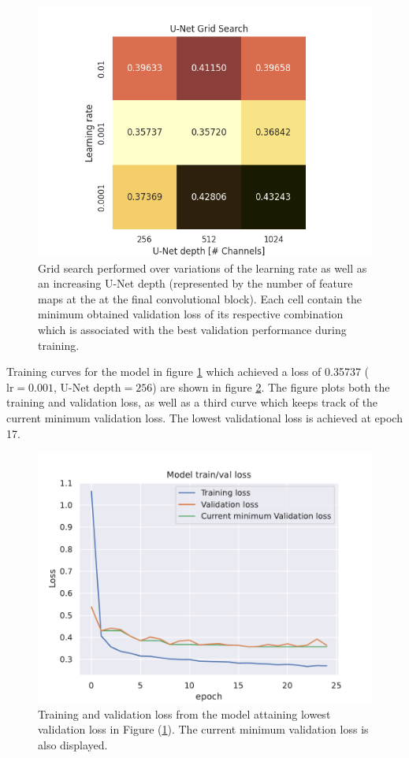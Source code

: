 \documentclass[../main/thesis]{subfiles}
\begin{document}
\begin{figure}
    \centering
    \includegraphics[width=.8\textwidth]{grid_search}
    \caption{\label{fig:gs}Grid search performed over variations of the learning rate as well as an increasing U-Net depth (represented by the number of feature maps at the at the final convolutional block). Each cell contain the minimum obtained validation loss of its respective combination which is associated with the best validation performance during training.}
\end{figure}

Training curves for the model in figure \ref{fig:gs} which achieved a loss of 0.35737 ($\text{lr} = 0.001$, $\text{U-Net depth} = 256$) are shown in figure \ref{fig:loss_curve_from_gs}. The figure plots both the training and validation loss, as well as a third curve which keeps track of the current minimum validation loss. The lowest validational loss is achieved at epoch 17. 

\begin{figure}
    \centering
    \includegraphics[width=\textwidth]{loss_curve_best_model_gs}
    \caption{\label{fig:loss_curve_from_gs}Training and validation loss from the model attaining lowest validation loss in Figure (\ref{fig:gs}). The current minimum validation loss is also displayed.}
\end{figure}
\end{document}
